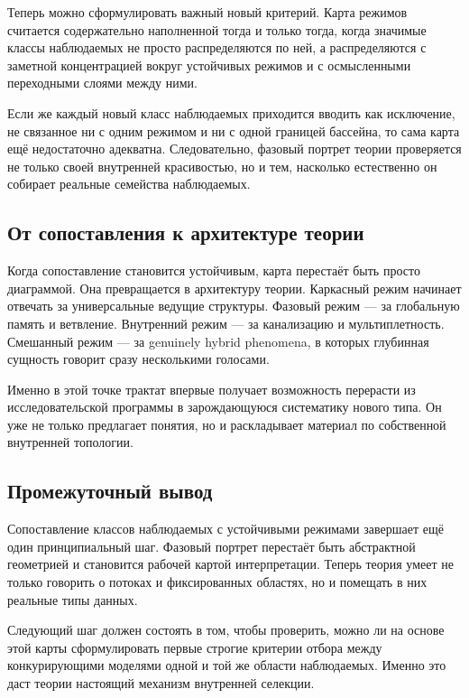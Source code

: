 \documentclass[12pt,a4paper]{article}
\begin{document}
Теперь можно сформулировать важный новый критерий. Карта режимов считается содержательно наполненной тогда и только тогда, когда значимые классы наблюдаемых не просто распределяются по ней, а распределяются с заметной концентрацией вокруг устойчивых режимов и с осмысленными переходными слоями между ними.

Если же каждый новый класс наблюдаемых приходится вводить как исключение, не связанное ни с одним режимом и ни с одной границей бассейна, то сама карта ещё недостаточно адекватна. Следовательно, фазовый портрет теории проверяется не только своей внутренней красивостью, но и тем, насколько естественно он собирает реальные семейства наблюдаемых.

\subsection{От сопоставления к архитектуре теории}

Когда сопоставление становится устойчивым, карта перестаёт быть просто диаграммой. Она превращается в архитектуру теории. Каркасный режим начинает отвечать за универсальные ведущие структуры. Фазовый режим --- за глобальную память и ветвление. Внутренний режим --- за канализацию и мультиплетность. Смешанный режим --- за genuinely hybrid phenomena, в которых глубинная сущность говорит сразу несколькими голосами.

Именно в этой точке трактат впервые получает возможность перерасти из исследовательской программы в зарождающуюся систематику нового типа. Он уже не только предлагает понятия, но и раскладывает материал по собственной внутренней топологии.

\subsection{Промежуточный вывод}

Сопоставление классов наблюдаемых с устойчивыми режимами завершает ещё один принципиальный шаг. Фазовый портрет перестаёт быть абстрактной геометрией и становится рабочей картой интерпретации. Теперь теория умеет не только говорить о потоках и фиксированных областях, но и помещать в них реальные типы данных.

Следующий шаг должен состоять в том, чтобы проверить, можно ли на основе этой карты сформулировать первые строгие критерии отбора между конкурирующими моделями одной и той же области наблюдаемых. Именно это даст теории настоящий механизм внутренней селекции.
\end{document}
